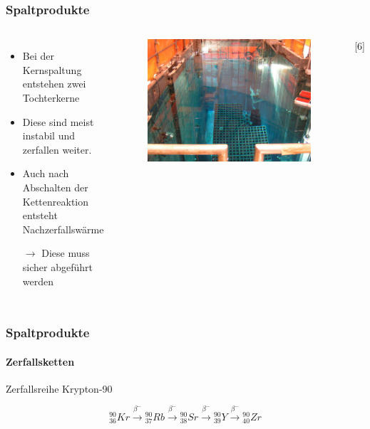 \documentclass{beamer}[9pt]
\begin{document}
\begin{frame}
\frametitle{Spaltprodukte}
\begin{columns}

\begin{itemize}

\item Bei der Kernspaltung entstehen zwei Tochterkerne
\item Diese sind meist instabil und zerfallen weiter.
\item Auch nach Abschalten der Kettenreaktion entsteht Nachzerfallswärme
\item[$\rightarrow$] Diese muss sicher abgeführt werden
\end{itemize}
\begin{figure}

\includegraphics[scale=.16]{abklingbecken.jpg}
\end{figure}
\hspace{.5\columnwidth}[6]
\end{columns}
\end{frame}

\begin{frame}
\frametitle{Spaltprodukte}
\framesubtitle{Zerfallsketten}


\begin{block}{Zerfallsreihe Krypton-90}

\[
^{90}_{36}Kr \overset{\beta^-}{\rightarrow}{} ^{90}_{37}Rb \overset{\beta^-}{\rightarrow} {}^{90}_{38}Sr \overset{\beta^-}{\rightarrow} {}^{90}_{39}Y \overset{\beta^-}{\rightarrow}{}^{90}_{40} Zr\]

\end{block}
\end{frame}
\end{document}

